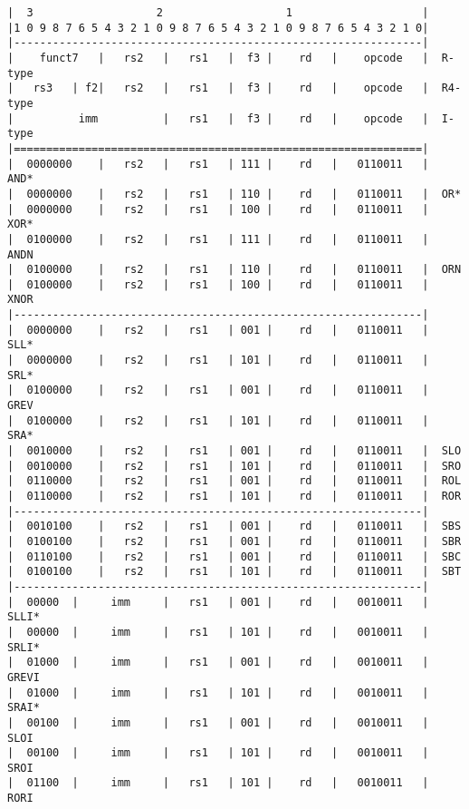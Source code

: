 \begin{minipage}{\linewidth}
\begin{verbatim}
|  3                   2                   1                    |
|1 0 9 8 7 6 5 4 3 2 1 0 9 8 7 6 5 4 3 2 1 0 9 8 7 6 5 4 3 2 1 0|
|---------------------------------------------------------------|
|    funct7   |   rs2   |   rs1   |  f3 |    rd   |    opcode   |  R-type
|   rs3   | f2|   rs2   |   rs1   |  f3 |    rd   |    opcode   |  R4-type
|          imm          |   rs1   |  f3 |    rd   |    opcode   |  I-type
|===============================================================|
|  0000000    |   rs2   |   rs1   | 111 |    rd   |   0110011   |  AND*
|  0000000    |   rs2   |   rs1   | 110 |    rd   |   0110011   |  OR*
|  0000000    |   rs2   |   rs1   | 100 |    rd   |   0110011   |  XOR*
|  0100000    |   rs2   |   rs1   | 111 |    rd   |   0110011   |  ANDN
|  0100000    |   rs2   |   rs1   | 110 |    rd   |   0110011   |  ORN
|  0100000    |   rs2   |   rs1   | 100 |    rd   |   0110011   |  XNOR
|---------------------------------------------------------------|
|  0000000    |   rs2   |   rs1   | 001 |    rd   |   0110011   |  SLL*
|  0000000    |   rs2   |   rs1   | 101 |    rd   |   0110011   |  SRL*
|  0100000    |   rs2   |   rs1   | 001 |    rd   |   0110011   |  GREV
|  0100000    |   rs2   |   rs1   | 101 |    rd   |   0110011   |  SRA*
|  0010000    |   rs2   |   rs1   | 001 |    rd   |   0110011   |  SLO
|  0010000    |   rs2   |   rs1   | 101 |    rd   |   0110011   |  SRO
|  0110000    |   rs2   |   rs1   | 001 |    rd   |   0110011   |  ROL
|  0110000    |   rs2   |   rs1   | 101 |    rd   |   0110011   |  ROR
|---------------------------------------------------------------|
|  0010100    |   rs2   |   rs1   | 001 |    rd   |   0110011   |  SBS
|  0100100    |   rs2   |   rs1   | 001 |    rd   |   0110011   |  SBR
|  0110100    |   rs2   |   rs1   | 001 |    rd   |   0110011   |  SBC
|  0100100    |   rs2   |   rs1   | 101 |    rd   |   0110011   |  SBT
|---------------------------------------------------------------|
|  00000  |     imm     |   rs1   | 001 |    rd   |   0010011   |  SLLI*
|  00000  |     imm     |   rs1   | 101 |    rd   |   0010011   |  SRLI*
|  01000  |     imm     |   rs1   | 001 |    rd   |   0010011   |  GREVI
|  01000  |     imm     |   rs1   | 101 |    rd   |   0010011   |  SRAI*
|  00100  |     imm     |   rs1   | 001 |    rd   |   0010011   |  SLOI
|  00100  |     imm     |   rs1   | 101 |    rd   |   0010011   |  SROI
|  01100  |     imm     |   rs1   | 101 |    rd   |   0010011   |  RORI

\end{verbatim}
\end{minipage}
